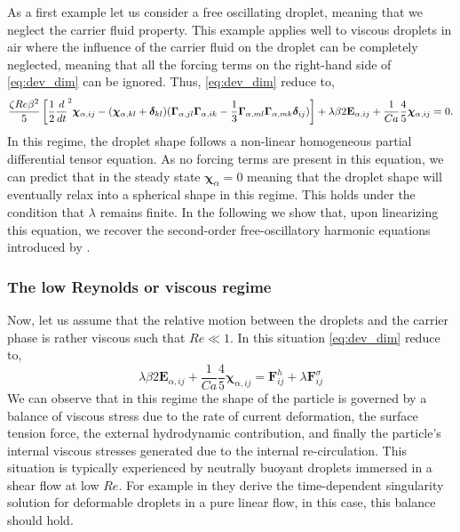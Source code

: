 As a first example let us consider a free oscillating droplet, meaning that we neglect the carrier fluid property. 
This example applies well to viscous droplets in air where the influence of the carrier fluid on the droplet can be completely neglected, meaning that all the forcing terms on the right-hand side of \ref{eq:dev_dim} can be ignored. 
Thus, \ref{eq:dev_dim} reduce to, 
\begin{multline}
    \frac{\zeta Re \beta^2}{5}
    \left[
        \frac{1}{2}\frac{d}{dt}^2 \bm\chi_{\alpha,ij}
        -  ( \bm\chi_{\alpha,kl} +\bm\delta_{kl})
        (\bm\Gamma_{\alpha,jl}\bm\Gamma_{\alpha,ik}  
        - \frac{1}{3}
        \bm\Gamma_{\alpha,ml}\bm\Gamma_{\alpha,mk}  
        \bm\delta_{ij}
        )
    \right]
    + \lambda \beta 2 \textbf{E}_{\alpha,ij}
    + \frac{1}{Ca}
    \frac{4  }{5} \bm\chi_{\alpha,ij}
    =
    0.
\end{multline}
In this regime, the droplet shape follows a non-linear homogeneous partial differential tensor equation. 
As no forcing terms are present in this equation, we can predict that in the steady state $\bm\chi_\alpha = 0$ meaning that the droplet shape will eventually relax into a spherical shape in this regime.
This holds under the condition that $\lambda$ remains finite.   
In the following we show that, upon linearizing this equation, we recover the second-order free-oscillatory harmonic equations introduced by \citet{lamb1924hydrodynamics}. 

\subsubsection{The low Reynolds or viscous regime}

Now, let us assume that the relative motion between the droplets and the carrier phase is rather viscous such that $Re \ll 1$.
In this situation \ref{eq:dev_dim} reduce to, 
\begin{equation*}
    \lambda \beta 2 \textbf{E}_{\alpha,ij}
    + \frac{1}{Ca}
    \frac{4  }{5} \bm\chi_{\alpha,ij}
    = \textbf{F}_{ij}^h 
    + \lambda \textbf{F}_{ij}^{\sigma}
    \label{eq:stokes_shape}
\end{equation*}
We can observe that in this regime the shape of the particle is governed by a balance of viscous stress due to the rate of current deformation, the surface tension force, the external hydrodynamic contribution, and finally the particle's internal viscous stresses generated due to the internal re-circulation. 
This situation is typically experienced by neutrally buoyant droplets immersed in a shear flow at low $Re$. 
For example in \citet[Chapter 7]{leal2007advanced} they derive the time-dependent singularity solution for deformable droplets in a pure linear flow, in this case, this balance should hold. 

